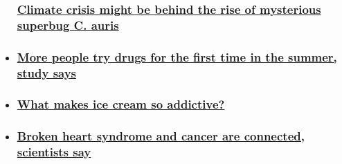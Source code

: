 \begin{itemize}
{  \subsubsection{\texorpdfstring{\href{/2019/07/23/health/superbug-candida-auris-climate-crisis-study/index.html}{Climate
  crisis might be behind the rise of mysterious superbug C.
  auris}}{Climate crisis might be behind the rise of mysterious superbug C. auris}}\label{climate-crisis-might-be-behind-the-rise-of-mysterious-superbug-c-auris}}
\item
  \hypertarget{more-people-try-drugs-for-the-first-time-in-the-summer-study-says}{%
  \subsubsection{\texorpdfstring{\href{/2019/07/23/health/drug-use-summer-study-trnd/index.html}{More
  people try drugs for the first time in the summer, study
  says}}{More people try drugs for the first time in the summer, study says}}\label{more-people-try-drugs-for-the-first-time-in-the-summer-study-says}}
\item
  \hypertarget{what-makes-ice-cream-so-addictive-}{%
  \subsubsection{\texorpdfstring{\href{/2018/05/02/health/ice-cream-addictive-food-drayer/index.html}{What
  makes ice cream so addictive?
  }}{What makes ice cream so addictive? }}\label{what-makes-ice-cream-so-addictive-}}
\item
  \hypertarget{broken-heart-syndrome-and-cancer-are-connected-scientists-say}{%
  \subsubsection{\texorpdfstring{\href{/2019/07/18/health/broken-heart-syndrome-cancer-trnd/index.html}{Broken
  heart syndrome and cancer are connected, scientists
  say}}{Broken heart syndrome and cancer are connected, scientists say}}\label{broken-heart-syndrome-and-cancer-are-connected-scientists-say}}
\end{itemize}

